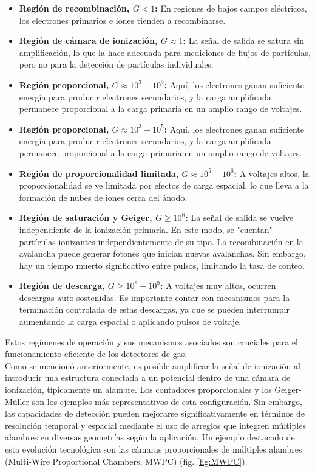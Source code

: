 \documentclass{report}
\begin{document}
\begin{itemize}
    \item \textbf{Región de recombinación, \(G < 1\):} En regiones de bajos campos eléctricos, los electrones primarios e iones tienden a recombinarse.
    \item \textbf{Región de cámara de ionización, \(G \approx 1\):} La señal de salida se satura sin amplificación, lo que la hace adecuada para mediciones de flujos de partículas, pero no para la detección de partículas individuales.
    \item \textbf{Región proporcional, \(G \approx 10^3 - 10^5\):} Aquí, los electrones ganan suficiente energía para producir electrones secundarios, y la carga amplificada permanece proporcional a la carga primaria en un amplio rango de voltajes.
    \item \textbf{Región proporcional, \(G \approx 10^3 - 10^5\):} Aquí, los electrones ganan suficiente energía para producir electrones secundarios, y la carga amplificada permanece proporcional a la carga primaria en un amplio rango de voltajes.
    \item \textbf{Región de proporcionalidad limitada, \(G \approx 10^5 - 10^8\):} A voltajes altos, la proporcionalidad se ve limitada por efectos de carga espacial, lo que lleva a la formación de nubes de iones cerca del ánodo.
    \item \textbf{Región de saturación y Geiger, \(G \geq 10^8\):} La señal de salida se vuelve independiente de la ionización primaria. En este modo, se "cuentan" partículas ionizantes independientemente de su tipo. La recombinación en la avalancha puede generar fotones que inician nuevas avalanchas. Sin embargo, hay un tiempo muerto significativo entre pulsos, limitando la tasa de conteo.
    \item \textbf{Región de descarga, \(G \geq 10^8 - 10^9\):} A voltajes muy altos, ocurren descargas auto-sostenidas. Es importante contar con mecanismos para la terminación controlada de estas descargas, ya que se pueden interrumpir aumentando la carga espacial o aplicando pulsos de voltaje.
\end{itemize}

\noindent Estos regímenes de operación y sus mecanismos asociados son cruciales para el funcionamiento eficiente de los detectores de gas.\\

\noindent Como se mencionó anteriormente, es posible amplificar la señal de ionización al introducir una estructura conectada a un potencial dentro de una cámara de ionización, típicamente un alambre. Los contadores proporcionales y los Geiger-Müller son los ejemplos más representativos de esta configuración. Sin embargo, las capacidades de detección pueden mejorarse significativamente en términos de resolución temporal y espacial mediante el uso de arreglos que integren múltiples alambres en diversas geometrías según la aplicación. Un ejemplo destacado de esta evolución tecnológica son las cámaras proporcionales de múltiples alambres (Multi-Wire Proportional Chambers, MWPC) (fig. \ref{fig:MWPC}).\\
\end{document}
